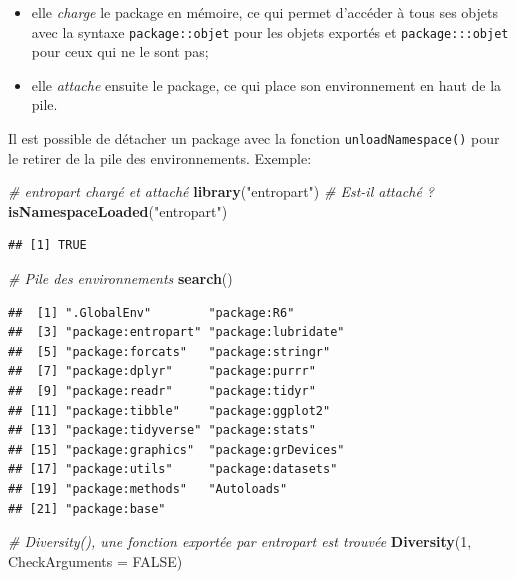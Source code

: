 \documentclass[
  12pt,
  french,
  a4paper,
  extrafontsizes,onecolumn,openright
  ]{memoir}
\newenvironment{Shaded}{\begin{snugshade}}{\end{snugshade}}
\newcommand{\AttributeTok}[1]{\textcolor[rgb]{0.13,0.29,0.53}{#1}}
\newcommand{\CommentTok}[1]{\textcolor[rgb]{0.56,0.35,0.01}{\textit{#1}}}
\newcommand{\ConstantTok}[1]{\textcolor[rgb]{0.56,0.35,0.01}{#1}}
\newcommand{\DecValTok}[1]{\textcolor[rgb]{0.00,0.00,0.81}{#1}}
\newcommand{\FunctionTok}[1]{\textcolor[rgb]{0.13,0.29,0.53}{\textbf{#1}}}
\newcommand{\NormalTok}[1]{#1}
\newcommand{\StringTok}[1]{\textcolor[rgb]{0.31,0.60,0.02}{#1}}
\providecommand{\tightlist}{%
  \setlength{\itemsep}{0pt}\setlength{\parskip}{0pt}}
\begin{document}
\begin{itemize}
\tightlist
\item
  elle \emph{charge} le package en mémoire, ce qui permet d'accéder à tous ses objets avec la syntaxe \texttt{package::objet} pour les objets exportés et \texttt{package:::objet} pour ceux qui ne le sont pas;
\item
  elle \emph{attache} ensuite le package, ce qui place son environnement en haut de la pile.
\end{itemize}

Il est possible de détacher un package avec la fonction \texttt{unloadNamespace()} pour le retirer de la pile des environnements.
Exemple:

\scriptsize

\begin{Shaded}
\begin{Highlighting}[]
\CommentTok{\# entropart chargé et attaché}
\FunctionTok{library}\NormalTok{(}\StringTok{"entropart"}\NormalTok{)}
\CommentTok{\# Est{-}il attaché ?}
\FunctionTok{isNamespaceLoaded}\NormalTok{(}\StringTok{"entropart"}\NormalTok{)}
\end{Highlighting}
\end{Shaded}

\begin{verbatim}
## [1] TRUE
\end{verbatim}

\begin{Shaded}
\begin{Highlighting}[]
\CommentTok{\# Pile des environnements}
\FunctionTok{search}\NormalTok{()}
\end{Highlighting}
\end{Shaded}

\begin{verbatim}
##  [1] ".GlobalEnv"        "package:R6"       
##  [3] "package:entropart" "package:lubridate"
##  [5] "package:forcats"   "package:stringr"  
##  [7] "package:dplyr"     "package:purrr"    
##  [9] "package:readr"     "package:tidyr"    
## [11] "package:tibble"    "package:ggplot2"  
## [13] "package:tidyverse" "package:stats"    
## [15] "package:graphics"  "package:grDevices"
## [17] "package:utils"     "package:datasets" 
## [19] "package:methods"   "Autoloads"        
## [21] "package:base"
\end{verbatim}

\begin{Shaded}
\begin{Highlighting}[]
\CommentTok{\# Diversity(), une fonction exportée par entropart est trouvée}
\FunctionTok{Diversity}\NormalTok{(}\DecValTok{1}\NormalTok{, }\AttributeTok{CheckArguments =} \ConstantTok{FALSE}\NormalTok{)}
\end{Highlighting}
\end{Shaded}
\end{document}
